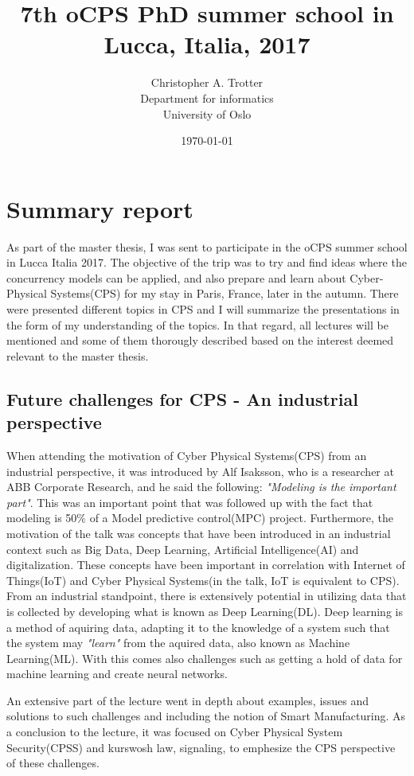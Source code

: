 \documentclass[9pt, english, a4paper]{article}
\title{7th oCPS PhD summer school in Lucca, Italia, 2017}
\author{Christopher A. Trotter \\ Department for informatics\\ University of Oslo}
\date{\today{}}
\theoremstyle{definition}
\begin{document}
\maketitle{}


\section{Summary report}
	As part of the master thesis, I was sent to participate in the oCPS summer school in Lucca Italia 2017. The objective of the trip was to try and find ideas where the concurrency models can be applied, and also prepare and learn about Cyber-Physical Systems(CPS) for my stay in Paris, France, later in the autumn. There were presented different topics in CPS and I will summarize the presentations in the form of my understanding of the topics. In that regard, all lectures will be mentioned and some of them thorougly described based on the interest deemed relevant to the master thesis.

\subsection{Future challenges for CPS - An industrial perspective}

	When attending the motivation of Cyber Physical Systems(CPS) from an industrial perspective, it was introduced by Alf Isaksson, who is a researcher at ABB Corporate Research, and he said the following: \emph{"Modeling is the important part"}. This was an important point that was followed up with the fact that modeling is 50\% of a Model predictive control(MPC) project. Furthermore, the motivation of the talk was concepts that have been introduced in an industrial context such as Big Data, Deep Learning, Artificial Intelligence(AI) and digitalization. These concepts have been important in correlation with Internet of Things(IoT) and Cyber Physical Systems(in the talk, IoT is equivalent to CPS). From an industrial standpoint, there is extensively potential in utilizing data that is collected by developing what is known as Deep Learning(DL). Deep learning is a method of aquiring data, adapting it to the knowledge of a system such that the system may \emph{"learn"} from the aquired data, also known as Machine Learning(ML). With this comes also challenges such as getting a hold of data for machine learning and create neural networks.

	An extensive part of the lecture went in depth about examples, issues and solutions to such challenges and including the notion of Smart Manufacturing. As a conclusion to the lecture, it was focused on Cyber Physical System Security(CPSS) and kurswosh law, signaling, to emphesize the CPS perspective of these challenges.
\end{document}
